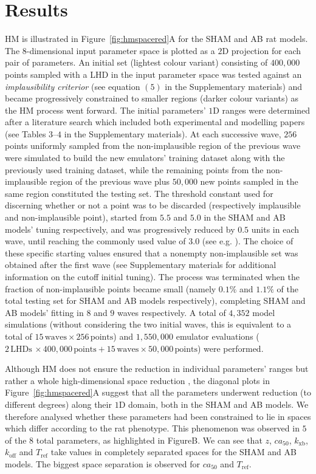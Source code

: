 \section{Results}\label{sec:ch4results}
HM is illustrated in Figure~\ref{fig:hmspacered}A for the SHAM and AB rat models. The $8$-dimensional input parameter space is plotted as a $2$D projection for each pair of parameters. An initial set (lightest colour variant) consisting of $400,000$ points sampled with a LHD in the input parameter space was tested against an \textit{implausibility criterior} (see equation $(5)$ in the Supplementary materials) and became progressively constrained to smaller regions (darker colour variants) as the HM process went forward. The initial parameters' $1$D ranges were determined after a literature search which included both experimental and modelling papers (see Tables $3$--$4$ in the Supplementary materials). At each successive wave, $256$ points uniformly sampled from the non-implausible region of the previous wave were simulated to build the new emulators' training dataset along with the previously used training dataset, while the remaining points from the non-implausible region of the previous wave plus $50,000$ new points sampled in the same region constituted the testing set. The threshold constant used for discerning whether or not a point was to be discarded (respectively implausible and non-implausible point), started from $5.5$ and $5.0$ in the SHAM and AB models' tuning respectively, and was progressively reduced by $0.5$ units in each wave, until reaching the commonly used value of $3.0$ (see e.g. \cite{Vernon:2010}). The choice of these specific starting values ensured that a nonempty non-implausible set was obtained after the first wave (see Supplementary materials for additional information on the cutoff initial tuning). The process was terminated when the fraction of non-implausible points became small (namely $0.1\%$ and $1.1\%$ of the total testing set for SHAM and AB models respectively), completing SHAM and AB models' fitting in $8$ and $9$ waves respectively. A total of $4,352$ model simulations (without considering the two initial waves, this is equivalent to a total of $15\,\text{waves}\times 256\,\text{points}$) and $1,550,000$ emulator evaluations ($2\,\text{LHDs}\,\times 400,000\,\text{points}+15\,\text{waves}\times 50,000\,\text{points}$) were performed.

\vspace{0.2cm}
Although HM does not ensure the reduction in individual parameters' ranges but rather a whole high-dimensional space reduction \cite{Coveney:2018}, the diagonal plots in Figure~\ref{fig:hmspacered}A suggest that all the parameters underwent reduction (to different degrees) along their $1$D domain, both in the SHAM and AB models. We therefore analysed whether these parameters had been constrained to lie in spaces which differ according to the rat phenotype. This phenomenon was observed in $5$ of the $8$ total parameters, as highlighted in FigureB. We can see that $z$, $ca_{50}$, $k_{\textrm{xb}}$, $k_{\textrm{off}}$ and $T_{\textrm{ref}}$ take values in completely separated spaces for the SHAM and AB models. The biggest space separation is observed for $ca_{50}$ and $T_{\textrm{ref}}$.

